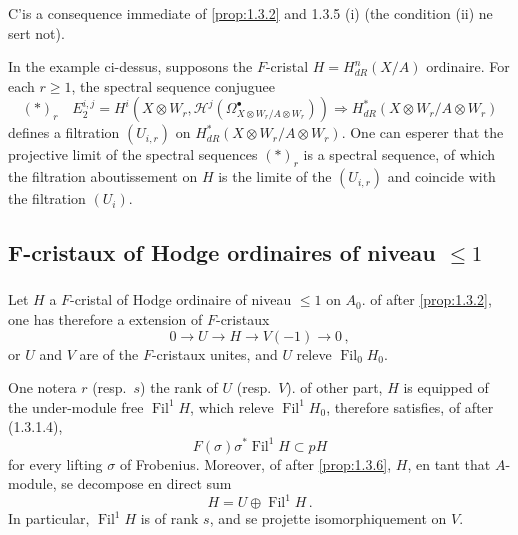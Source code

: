 \documentclass[12pt,a4paper]{article}
\theoremstyle{plain}
\theoremstyle{definition}
\theoremstyle{remark}
\DeclareMathOperator{\Fil}{Fil}
\begin{document}
C'is a consequence immediate of \ref{prop:1.3.2} and 1.3.5 (i) (the condition (ii) ne sert not).

In the example ci-dessus, supposons the $F$-cristal $H = H_{dR}^n(X/A)$ ordinaire. For each $r \geq 1$, the spectral sequence conjuguee
\[
(*)_{r}\quad E_2^{i,j} = H^i(X \otimes W_r, \mathcal{H}^j(\Omega_{X \otimes W_r/A \otimes W_r}^\bullet)) \Longrightarrow H_{dR}^*(X \otimes W_r/A \otimes W_r)
\]
defines a filtration $(U_{i,r})$ on $H_{dR}^*(X \otimes W_r/A \otimes W_r)$. One can esperer that the projective limit of the spectral sequences $(*)_r$ is a spectral sequence, of which the filtration aboutissement on $H$ is the limite of the $(U_{i,r})$ and coincide with the filtration $(U_i)$.

\subsection{F-cristaux of Hodge ordinaires of niveau $\leq 1$}

\subsubsection{}

Let $H$ a $F$-cristal of Hodge ordinaire of niveau $\leq 1$ on $A_0$. of after \ref{prop:1.3.2}, one has therefore a extension of $F$-cristaux
\begin{equation}\label{eq:1.4.1.1}
0 \longrightarrow U \longrightarrow H \longrightarrow V(-1) \longrightarrow 0\,,
\end{equation}
or $U$ and $V$ are of the $F$-cristaux unites, and $U$ releve $\Fil_0H_0$.

One notera $r$ (resp.\ $s$) the rank of $U$ (resp.\ $V$). of other part, $H$ is equipped of the under-module free $\Fil^1H$, which releve $\Fil^1H_0$, therefore satisfies, of after (1.3.1.4),
\begin{equation}\label{eq:1.4.1.2}
F(\sigma)\sigma^*\Fil^1H \subset pH
\end{equation}
for every lifting $\sigma$ of Frobenius. Moreover, of after \ref{prop:1.3.6}, $H$, en tant that $A$-module, se decompose en direct sum
\begin{equation}\label{eq:1.4.1.3}
H = U \oplus \Fil^1H\,.\end{equation}
In particular, $\Fil^1H$ is of rank $s$, and se projette isomorphiquement on $V$.
\end{document}

